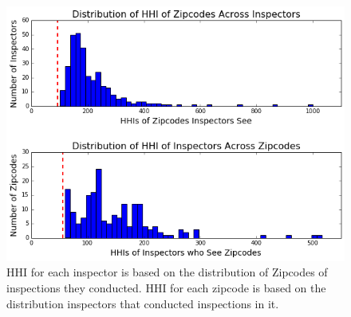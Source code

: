 \documentclass[handout]{beamer}
\begin{document}
\begin{frame}
\begin{figure}
    \centering
    \includegraphics[scale = 0.45]{zip_herf.png}
    \caption{\tiny{HHI for each inspector is based on the distribution of Zipcodes of inspections they conducted. HHI for each zipcode is based on the distribution inspectors that conducted inspections in it.}}
\end{figure}
\end{frame}
\end{document}
